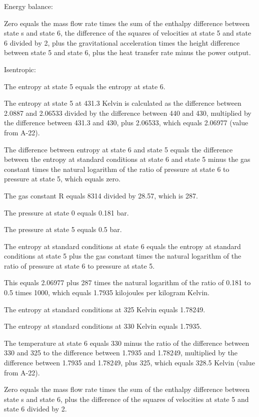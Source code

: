 Energy balance:

Zero equals the mass flow rate times the sum of the enthalpy difference between state s and state 6, the difference of the squares of velocities at state 5 and state 6 divided by 2, plus the gravitational acceleration times the height difference between state 5 and state 6, plus the heat transfer rate minus the power output.

Isentropic:

The entropy at state 5 equals the entropy at state 6.

The entropy at state 5 at 431.3 Kelvin is calculated as the difference between 2.0887 and 2.06533 divided by the difference between 440 and 430, multiplied by the difference between 431.3 and 430, plus 2.06533, which equals 2.06977 (value from A-22).

The difference between entropy at state 6 and state 5 equals the difference between the entropy at standard conditions at state 6 and state 5 minus the gas constant times the natural logarithm of the ratio of pressure at state 6 to pressure at state 5, which equals zero.

The gas constant R equals 8314 divided by 28.57, which is 287.

The pressure at state 0 equals 0.181 bar.

The pressure at state 5 equals 0.5 bar.

The entropy at standard conditions at state 6 equals the entropy at standard conditions at state 5 plus the gas constant times the natural logarithm of the ratio of pressure at state 6 to pressure at state 5.

This equals 2.06977 plus 287 times the natural logarithm of the ratio of 0.181 to 0.5 times 1000, which equals 1.7935 kilojoules per kilogram Kelvin.

The entropy at standard conditions at 325 Kelvin equals 1.78249.

The entropy at standard conditions at 330 Kelvin equals 1.7935.

The temperature at state 6 equals 330 minus the ratio of the difference between 330 and 325 to the difference between 1.7935 and 1.78249, multiplied by the difference between 1.7935 and 1.78249, plus 325, which equals 328.5 Kelvin (value from A-22).

Zero equals the mass flow rate times the sum of the enthalpy difference between state s and state 6, plus the difference of the squares of velocities at state 5 and state 6 divided by 2.

